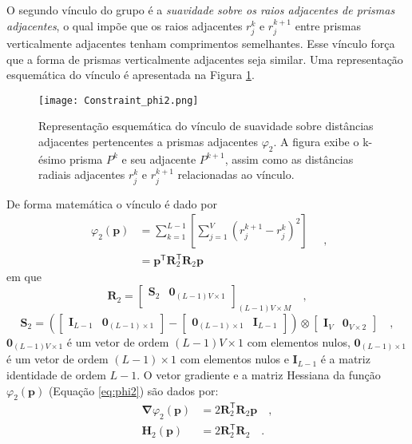 O segundo vínculo do grupo é a \textit{suavidade sobre os raios adjacentes de prismas adjacentes}, o qual impõe que os raios adjacentes $r_{j}^{k}$ e $r_{j}^{k+1}$ entre prismas verticalmente adjacentes tenham comprimentos semelhantes. Esse vínculo força que a forma de prismas verticalmente adjacentes seja similar. Uma representação esquemática do vínculo é apresentada na Figura \ref{fig:phi2}.

\begin{figure}[!htb]
	\centering
	\texttt{[image: Constraint\_phi2.png]}
	\caption{Representação esquemática do vínculo de suavidade sobre distâncias adjacentes pertencentes a prismas adjacentes $\varphi_{2}$. A figura exibe o k-ésimo prisma $P^k$ e seu adjacente $P^{k+1}$, assim como as distâncias radiais adjacentes $r_j^k$ e $r_j^{k+1}$ relacionadas ao vínculo.}
	\label{fig:phi2}
\end{figure}

De forma matemática o vínculo é dado por
\begin{equation}\label{eq:phi2}
\begin{split}
\varphi_{2}(\mathbf{p}) &= \sum\limits^{L-1}_{k=1}\left[\sum\limits^{V}_{j=1}\left(r^{k+1}_{j}-r^{k}_{j}\right)^2\right] \\
&= \mathbf{p}^{\mathsf{T}} \mathbf{R}^{\mathsf{T}}_{2}\mathbf{R}_{2}\mathbf{p}
\end{split} \quad ,
\end{equation}
em que
\begin{equation}
\mathbf{R}_{2} = 
\begin{bmatrix}
\mathbf{S}_{2} & \mathbf{0}_{(L-1)V \times 1} \\
\end{bmatrix}_{(L-1)V \times M} \quad ,
\label{eq:R2-matrix}
\end{equation}
\begin{equation}
\mathbf{S}_{2} =
\left( 
\begin{bmatrix} \mathbf{I}_{L-1} & \mathbf{0}_{(L-1) \times 1} \end{bmatrix} -
\begin{bmatrix} \mathbf{0}_{(L-1) \times 1} & \mathbf{I}_{L-1} \end{bmatrix} 
\right) \otimes 
\begin{bmatrix} \mathbf{I}_{V} & \mathbf{0}_{V \times 2} \end{bmatrix} \quad ,
\label{eq:S2-matrix}
\end{equation}
$\mathbf{0}_{(L-1)V \times 1}$ é um vetor de ordem $(L-1)V \times 1$ com elementos nulos,
$\mathbf{0}_{(L-1) \times 1}$ é um vetor de ordem $(L-1) \times 1$ com elementos nulos e 
$\mathbf{I}_{L-1}$ é a matriz identidade de ordem $L-1$. O vetor gradiente e a matriz Hessiana da função $\varphi_{2}(\mathbf{p})$ (Equação \ref{eq:phi2}) são dados por:
\begin{equation}\label{eq:phi2_gh}
\begin{split}
\boldsymbol{\nabla}\varphi_{2}(\mathbf{p}) &= 2\mathbf{R}^\mathsf{T}_{2}\mathbf{R}_{2}\mathbf{p} \quad ,\\
\mathbf{H}_{2}(\mathbf{p}) &= 2\mathbf{R}^\mathsf{T}_{2}\mathbf{R}_{2} \quad .
\end{split}
\end{equation}

